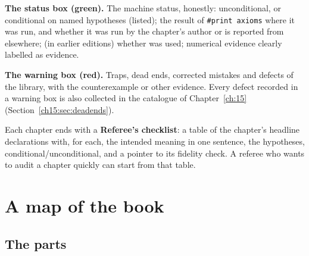 \begin{status}
\textbf{The status box (green).} The machine status, honestly: unconditional, or conditional on named
hypotheses (listed); the result of \texttt{\#print axioms} where it was run, and whether it was run
by the chapter's author or is reported from elsewhere; (in earlier editions) whether  was used; numerical
evidence clearly labelled as evidence.
\end{status}

\begin{warning}
\textbf{The warning box (red).} Traps, dead ends, corrected mistakes and defects of the library, with
the counterexample or other evidence. Every defect recorded in a warning box is also collected in
the catalogue of Chapter~\ref{ch:15} (Section~\ref{ch15:sec:deadends}).
\end{warning}

Each chapter ends with a \textbf{Referee's checklist}: a table of the chapter's headline
declarations with, for each, the intended meaning in one sentence, the hypotheses,
conditional/unconditional, and a pointer to its fidelity check. A referee who wants to audit a
chapter quickly can start from that table.

\section{A map of the book}\label{ch01:sec:map}

\subsection{The parts}

